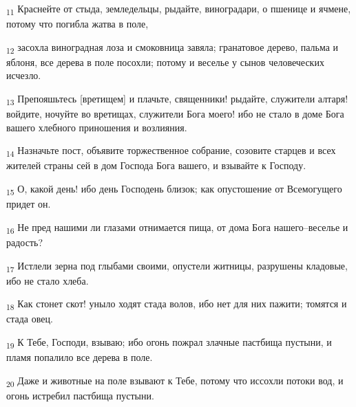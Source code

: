 \begin{tcolorbox}
\textsubscript{11} Краснейте от стыда, земледельцы, рыдайте, виноградари, о пшенице и ячмене, потому что погибла жатва в поле,
\end{tcolorbox}
\begin{tcolorbox}
\textsubscript{12} засохла виноградная лоза и смоковница завяла; гранатовое дерево, пальма и яблоня, все дерева в поле посохли; потому и веселье у сынов человеческих исчезло.
\end{tcolorbox}
\begin{tcolorbox}
\textsubscript{13} Препояшьтесь [вретищем] и плачьте, священники! рыдайте, служители алтаря! войдите, ночуйте во вретищах, служители Бога моего! ибо не стало в доме Бога вашего хлебного приношения и возлияния.
\end{tcolorbox}
\begin{tcolorbox}
\textsubscript{14} Назначьте пост, объявите торжественное собрание, созовите старцев и всех жителей страны сей в дом Господа Бога вашего, и взывайте к Господу.
\end{tcolorbox}
\begin{tcolorbox}
\textsubscript{15} О, какой день! ибо день Господень близок; как опустошение от Всемогущего придет он.
\end{tcolorbox}
\begin{tcolorbox}
\textsubscript{16} Не пред нашими ли глазами отнимается пища, от дома Бога нашего--веселье и радость?
\end{tcolorbox}
\begin{tcolorbox}
\textsubscript{17} Истлели зерна под глыбами своими, опустели житницы, разрушены кладовые, ибо не стало хлеба.
\end{tcolorbox}
\begin{tcolorbox}
\textsubscript{18} Как стонет скот! уныло ходят стада волов, ибо нет для них пажити; томятся и стада овец.
\end{tcolorbox}
\begin{tcolorbox}
\textsubscript{19} К Тебе, Господи, взываю; ибо огонь пожрал злачные пастбища пустыни, и пламя попалило все дерева в поле.
\end{tcolorbox}
\begin{tcolorbox}
\textsubscript{20} Даже и животные на поле взывают к Тебе, потому что иссохли потоки вод, и огонь истребил пастбища пустыни.
\end{tcolorbox}
